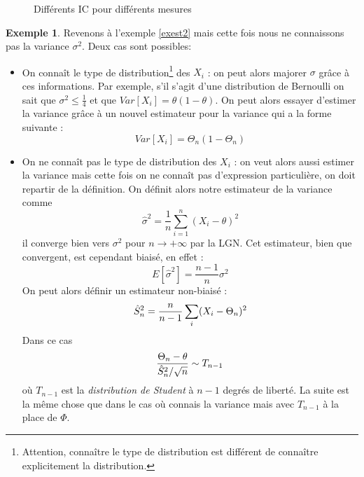 \documentclass[a4paper,12pt]{report}
\theoremstyle{definition}
\newcommand{\ra}{\rightarrow}
\renewcommand{\(}{\left(}
\renewcommand{\)}{\right)}
\renewcommand{\d}{\textit}
\newtheorem{exmp}[thm]{Exemple}
\begin{document}
        \begin{figure}[H]
            \centering
            \caption{Différents IC pour différents mesures}
            \label{fig:my_label}
        \end{figure}
        
        \begin{exmp}
            Revenons à l'exemple \ref{exest2} mais cette fois nous ne connaissons pas la variance $\sigma^2$. Deux cas sont possibles:
            \begin{itemize}[label = \textbullet]
                \item On connaît le type de distribution\footnote{Attention, connaître le type de distribution est différent de connaître explicitement la distribution.} des $X_i$ : on peut alors majorer $\sigma$ grâce à ces informations. Par exemple, s'il s'agit d'une distribution de Bernoulli on sait que $\sigma^2\leq\frac{1}{4}$ et que $Var[X_i] = \theta(1-\theta)$. On peut alors essayer d'estimer la variance grâce à un nouvel estimateur pour la variance qui a la forme suivante :
                $$Var[X_i] = \Theta_n(1-\Theta_n)$$
                \item On ne connaît pas le type de distribution des $X_i$ : on veut alors aussi estimer la variance mais cette fois on ne connaît pas d'expression particulière, on doit repartir de la définition. On définit alors notre estimateur de la variance comme 
                $$\hat{\sigma}^2 = \frac{1}{n}\sum_{i=1}^n(X_i-\theta)^2$$
                il converge bien vers $\sigma^2$ pour $n\ra+\infty$ par la LGN. Cet estimateur, bien que convergent, est cependant biaisé, en effet :
                $$E[\hat{\sigma}^2] = \frac{n-1}{n}\sigma^2$$
                On peut alors définir un estimateur non-biaisé :
                $$\Hat{S}_n^2 = \frac{n}{n-1}\sum_{i}(X_i-\Theta_n)^2$$
                Dans ce cas $$\frac{\Theta_n-\theta}{\Hat{S}_n^2/\sqrt{n}}\sim T_{n-1}$$
                où $T_{n-1}$ est la \d{distribution de Student} à $n-1$ degrés de liberté. La suite est la même chose que dans le cas où connais la variance mais avec $T_{n-1}$ à la place de $\Phi$.
            \end{itemize}
        \end{exmp}
        
\end{document}
